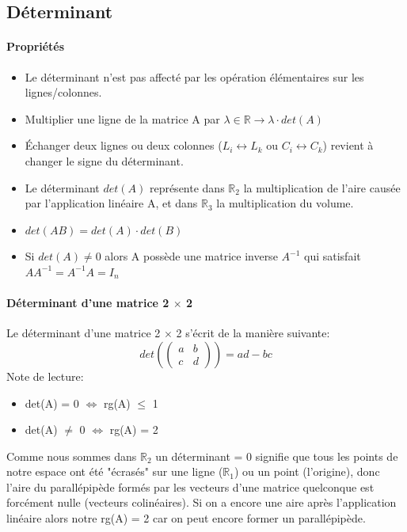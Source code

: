\documentclass[10pt,a4paper]{book}
\newcommand{\R}{\mathbb{R}}
\newcommand{\x}{$\times$ }
\begin{document}
\subsection{Déterminant}

\paragraph{Propriétés}
\begin{itemize}
\item Le déterminant n'est pas affecté par les opération élémentaires sur les lignes/colonnes. 
\item Multiplier une ligne de la matrice A par $\lambda \in \R \rightarrow \lambda \cdot det(A)$ 
\item Échanger deux lignes ou deux colonnes (\(L_i \leftrightarrow L_k\) ou \(C_i \leftrightarrow C_k\)) revient à changer le signe du déterminant.
\item Le déterminant $det(A)$ représente dans $\R_2$ la multiplication de l'aire causée par l'application linéaire A, et dans $\R_3$ la multiplication du volume.
\item $det(AB) = det(A) \cdot det(B)$
\item Si $det(A) \neq 0$ alors A possède une matrice inverse $A^{-1}$ qui satisfait $AA^{-1} = A^{-1}A = I_n$ 
\end{itemize}

\paragraph{Déterminant d'une matrice 2 \x 2} Le déterminant d'une matrice 2 \x 2 s'écrit de la manière suivante: 
\[det\left(\begin{pmatrix}
a & b \\
c & d
\end{pmatrix}\right)
= ad - bc
\]
Note de lecture:
\begin{itemize}
\item det(A) = 0 $\Longleftrightarrow$ rg(A) $\leq$ 1 
\item det(A) $\neq$ 0 $\Longleftrightarrow$ rg(A) = 2 
\end{itemize}
Comme nous sommes dans $\R_2$ un déterminant = 0 signifie que tous les points de notre espace ont été "écrasés" sur une ligne ($\R_1$) ou un point (l'origine), donc l'aire du parallépipède formés par les vecteurs d'une matrice quelconque est forcément nulle (vecteurs colinéaires). Si on a encore une aire après l'application linéaire alors notre rg(A) = 2 car on peut encore former un parallépipède.
\end{document}
